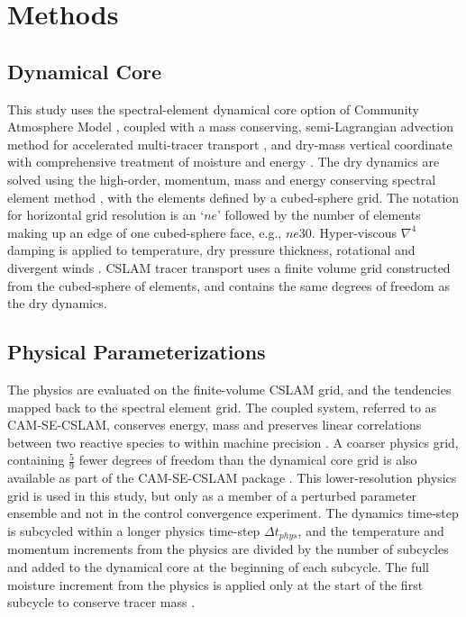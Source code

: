 \documentclass[alpha-refs]{wiley-article}
\begin{document}
\section{Methods}

\subsection{Dynamical Core}

This study uses the spectral-element dynamical core option of Community Atmosphere Model \citep[CAM-SE;][]{DetAl2012IJHPCA}, coupled with a mass conserving, semi-Lagrangian advection method for accelerated multi-tracer transport \citep[CSLAM;][]{LTOUNGK2017MWR}, and dry-mass vertical coordinate with comprehensive treatment of moisture and energy \citep{LetAl2018JAMES}. The dry dynamics are solved using the high-order, momentum, mass and energy conserving spectral element method \citep{TF2010JCP}, with the elements defined by a cubed-sphere grid. The notation for horizontal grid resolution is an `$ne$' followed by the number of elements making up an edge of one cubed-sphere face, e.g., $ne30$. Hyper-viscous $\nabla^{4}$ damping is applied to temperature, dry pressure thickness, rotational and divergent winds \citep{LetAl2018JAMES}. CSLAM tracer transport uses a finite volume grid constructed from the cubed-sphere of elements, and contains the same degrees of freedom as the dry dynamics.

\subsection{Physical Parameterizations}

The physics are evaluated on the finite-volume CSLAM grid, and the tendencies mapped back to the spectral element grid. The coupled system, referred to as CAM-SE-CSLAM, conserves energy, mass and preserves linear correlations between two reactive species to within machine precision \citep{HL2018MWR}. A coarser physics grid, containing $\frac{5}{9}$ fewer degrees of freedom than the dynamical core grid is also available as part of the CAM-SE-CSLAM package \citep{HETAL2019JAMES}. This lower-resolution physics grid is used in this study, but only as a member of a perturbed parameter ensemble and not in the control convergence experiment. The dynamics time-step is subcycled within a longer physics time-step $\Delta t_{phys}$, and the temperature and momentum increments from the physics are divided by the number of subcycles and added to the dynamical core at the beginning of each subcycle. The full moisture increment from the physics is applied only at the start of the first subcycle to conserve tracer mass \citep[$ftype=2$ option in][]{LW2019JAMES}.
\end{document}
